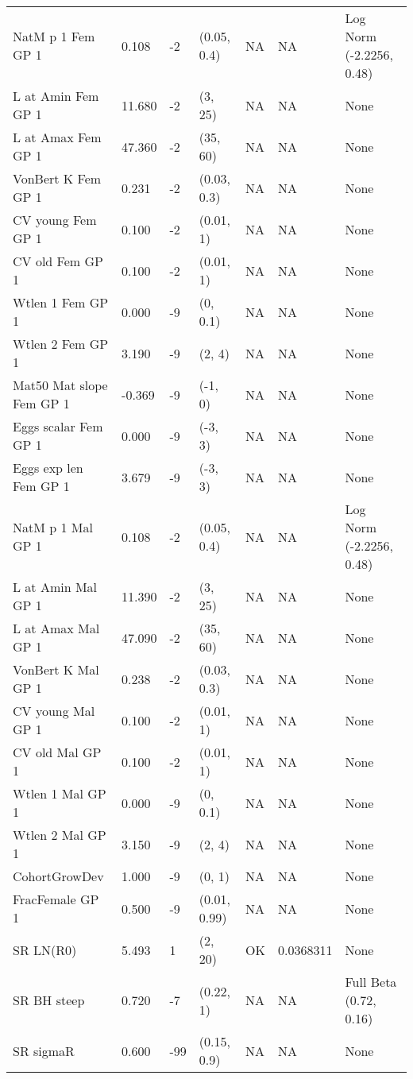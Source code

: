 \documentclass[11pt,
  english,
  a4paper,
]{article}
\begin{document}
\begin{landscape}
\begin{longtable}[t]{>{\raggedright\arraybackslash}p{6cm}lllll>{\raggedright\arraybackslash}p{4cm}}
\endfoot
\bottomrule
\endlastfoot
NatM p 1 Fem GP 1 & 0.108 & -2 & (0.05, 0.4) & NA & NA & Log Norm (-2.2256, 0.48)\\
L at Amin Fem GP 1 & 11.680 & -2 & (3, 25) & NA & NA & None\\
L at Amax Fem GP 1 & 47.360 & -2 & (35, 60) & NA & NA & None\\
VonBert K Fem GP 1 & 0.231 & -2 & (0.03, 0.3) & NA & NA & None\\
CV young Fem GP 1 & 0.100 & -2 & (0.01, 1) & NA & NA & None\\
CV old Fem GP 1 & 0.100 & -2 & (0.01, 1) & NA & NA & None\\
Wtlen 1 Fem GP 1 & 0.000 & -9 & (0, 0.1) & NA & NA & None\\
Wtlen 2 Fem GP 1 & 3.190 & -9 & (2, 4) & NA & NA & None\\
Mat50%
Mat slope Fem GP 1 & -0.369 & -9 & (-1, 0) & NA & NA & None\\
Eggs scalar Fem GP 1 & 0.000 & -9 & (-3, 3) & NA & NA & None\\
Eggs exp len Fem GP 1 & 3.679 & -9 & (-3, 3) & NA & NA & None\\
NatM p 1 Mal GP 1 & 0.108 & -2 & (0.05, 0.4) & NA & NA & Log Norm (-2.2256, 0.48)\\
L at Amin Mal GP 1 & 11.390 & -2 & (3, 25) & NA & NA & None\\
L at Amax Mal GP 1 & 47.090 & -2 & (35, 60) & NA & NA & None\\
VonBert K Mal GP 1 & 0.238 & -2 & (0.03, 0.3) & NA & NA & None\\
CV young Mal GP 1 & 0.100 & -2 & (0.01, 1) & NA & NA & None\\
CV old Mal GP 1 & 0.100 & -2 & (0.01, 1) & NA & NA & None\\
Wtlen 1 Mal GP 1 & 0.000 & -9 & (0, 0.1) & NA & NA & None\\
Wtlen 2 Mal GP 1 & 3.150 & -9 & (2, 4) & NA & NA & None\\
CohortGrowDev & 1.000 & -9 & (0, 1) & NA & NA & None\\
FracFemale GP 1 & 0.500 & -9 & (0.01, 0.99) & NA & NA & None\\
SR LN(R0) & 5.493 & 1 & (2, 20) & OK & 0.0368311 & None\\
SR BH steep & 0.720 & -7 & (0.22, 1) & NA & NA & Full Beta (0.72, 0.16)\\
SR sigmaR & 0.600 & -99 & (0.15, 0.9) & NA & NA & None\\

\end{longtable}
\end{landscape}
\end{document}
